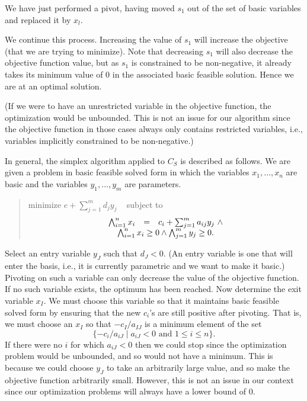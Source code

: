 \documentclass{article}
\begin{document}
We have just performed a pivot, having moved $s_1$ out of the set of basic
variables and replaced it by $x_l$.

We continue this process.  Increasing the value of $s_1$ will increase
the objective (that we are trying to minimize).  Note that decreasing $s_1$ will also decrease the
objective function value, but as $s_1$ is constrained to be non-negative,
it already takes its minimum value of $0$ in the associated basic feasible
solution.  Hence we are at an optimal solution.  

(If we were to have an unrestricted variable in the objective function, the
optimization would be unbounded.  This is not an issue for our algorithm 
since the objective function in those cases always only contains
restricted variables, i.e., variables implicitly constrained to be
non-negative.)

In general, the simplex algorithm applied to $C_S$ 
is described as follows. 
We are given a problem in basic feasible solved form in which 
the variables $x_1, \ldots ,x_n$ are basic and the variables
$y_1, \ldots ,y_m$ are parameters.
\begin{quote}\vspace*{-1ex}
minimize $e + \sum_{j=1}^{m} d_j y_j$
~ subject to 
$$
\begin{array}{rcr}
        \bigwedge_{i=1}^{n} x_i & = & c_i + \sum_{j=1}^{m} a_{ij} y_j ~\wedge\\
                  \multicolumn{3}{c}{\bigwedge_{i=1}^{n} x_i \ge 0 \wedge
                  \bigwedge_{j=1}^{m} y_j \ge 0. }
            \end{array}
$$
\end{quote}\vspace{-0.9ex}
Select an entry variable $y_J$ such that $d_J < 0$.  (An entry variable is
one that will enter the basis, i.e., it is currently parametric and we want
to make it basic.)
Pivoting on such a variable can only decrease the value of the objective
function.
If no such variable exists, the optimum has been reached.
Now determine the exit variable $x_I$\@.  We must choose this variable so that
it maintains  basic feasible solved form by ensuring 
that the new $c_i$'s are still positive after pivoting. 
That is, we must choose an $x_I$ 
so that $- c_I/ a_{IJ}$ is a minimum element
of the set
$$
\{ -c_i/a_{iJ} \mid a_{iJ} < 0 \mbox{ and } 1 \le i \le n \}.
$$
If there were no $i$ for which $a_{iJ} < 0$ then we could stop since the
optimization problem would be unbounded, and so would not have
a minimum.  This is because we could choose $y_J$ to take an arbitrarily
large value, and so make the objective function arbitrarily small.
However, this is not an issue in our context since our
optimization problems will always have a lower bound of 0.
\end{document}
